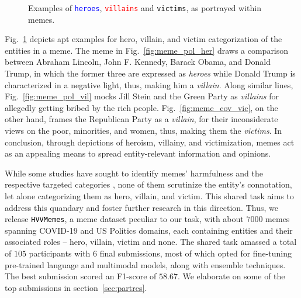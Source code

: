 \documentclass[11pt]{article}
\newcommand{\dataset}{\textcolor{black}{\texttt{HVVMemes}}}
\begin{document}
\begin{figure}[t!]
\caption{Examples of \texttt{\textcolor{blue}{heroes}}, \texttt{\textcolor{red}{villains}} and \texttt{\textcolor{deepgreen}{victims}}, as portrayed within memes.}
\label{fig:meme_hvv_eg}
\end{figure}



Fig.~\ref{fig:meme_hvv_eg} depicts apt examples for hero, villain, and victim categorization of the entities in a meme. The meme in Fig.~\ref{fig:meme_pol_her} draws a comparison between Abraham Lincoln, John F. Kennedy, Barack Obama, and Donald Trump, in which the former three are expressed as \emph{heroes} while Donald Trump is characterized in a negative light, thus, making him a \emph{villain}. Along similar lines, Fig.~\ref{fig:meme_pol_vil} mocks Jill Stein and the Green Party as \emph{villains} for allegedly getting bribed by the rich people. Fig.~\ref{fig:meme_cov_vic}, on the other hand, frames the Republican Party as a \emph{villain}, for their inconsiderate views on the poor, minorities, and women, thus, making them the \emph{victims}. In conclusion, through depictions of heroism, villainy, and victimization, memes act as an appealing means to spread entity-relevant information and opinions.

While some studies have sought to identify memes' harmfulness and the respective targeted categories \cite{pramanick-etal-2021-detecting,pramanick-etal-2021-momenta-multimodal}, none of them scrutinize the entity's connotation, let alone categorizing them as hero, villain, and victim. This shared task aims to address this quandary and foster further research in this direction. Thus, we release \dataset, a meme dataset peculiar to our task, with about $7000$ memes spanning COVID-19 and US Politics domains, each containing entities and their associated roles -- hero, villain, victim and none. The shared task amassed a total of $105$ participants with $6$ final submissions, most of which opted for fine-tuning pre-trained language and multimodal models, along with ensemble techniques. The best submission scored an F1-score of $58.67$. We elaborate on some of the top submissions in section~\ref{sec:partres}.
\end{document}
